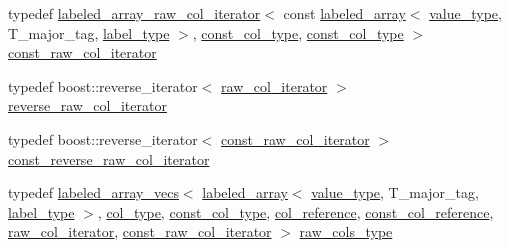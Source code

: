 \begin{DoxyCompactItemize}
\item 
typedef \hyperlink{classIceBRG_1_1labeled__array__raw__col__iterator}{labeled\+\_\+array\+\_\+raw\+\_\+col\+\_\+iterator}$<$ const \hyperlink{classIceBRG_1_1labeled__array}{labeled\+\_\+array}$<$ \hyperlink{classIceBRG_1_1labeled__array_a183002e8991647a6fbed8c13b64ff8f4}{value\+\_\+type}, T\+\_\+major\+\_\+tag, \hyperlink{classIceBRG_1_1labeled__array_a6355a8e274be241162cfe4717bcd907f}{label\+\_\+type} $>$, \hyperlink{classIceBRG_1_1labeled__array_aeba72c01006c312aedb340192a56901a}{const\+\_\+col\+\_\+type}, \hyperlink{classIceBRG_1_1labeled__array_aeba72c01006c312aedb340192a56901a}{const\+\_\+col\+\_\+type} $>$ \hyperlink{classIceBRG_1_1labeled__array_acfa6b748c386d02309a161e84f02e59d}{const\+\_\+raw\+\_\+col\+\_\+iterator}
\item 
typedef boost\+::reverse\+\_\+iterator$<$ \hyperlink{classIceBRG_1_1labeled__array_a61c797b83845ec6cc53d2ecb73899ad1}{raw\+\_\+col\+\_\+iterator} $>$ \hyperlink{classIceBRG_1_1labeled__array_a5c4132b2acc103385909ec165cd1a040}{reverse\+\_\+raw\+\_\+col\+\_\+iterator}
\item 
typedef boost\+::reverse\+\_\+iterator$<$ \hyperlink{classIceBRG_1_1labeled__array_acfa6b748c386d02309a161e84f02e59d}{const\+\_\+raw\+\_\+col\+\_\+iterator} $>$ \hyperlink{classIceBRG_1_1labeled__array_a397a1dbf20485f08dcf6b6a7b746d403}{const\+\_\+reverse\+\_\+raw\+\_\+col\+\_\+iterator}
\item 
typedef \hyperlink{classIceBRG_1_1labeled__array__vecs}{labeled\+\_\+array\+\_\+vecs}$<$ \hyperlink{classIceBRG_1_1labeled__array}{labeled\+\_\+array}$<$ \hyperlink{classIceBRG_1_1labeled__array_a183002e8991647a6fbed8c13b64ff8f4}{value\+\_\+type}, T\+\_\+major\+\_\+tag, \hyperlink{classIceBRG_1_1labeled__array_a6355a8e274be241162cfe4717bcd907f}{label\+\_\+type} $>$, \hyperlink{classIceBRG_1_1labeled__array_a4ee8f2983b8f309f1a8a470c12f56f2f}{col\+\_\+type}, \hyperlink{classIceBRG_1_1labeled__array_aeba72c01006c312aedb340192a56901a}{const\+\_\+col\+\_\+type}, \hyperlink{classIceBRG_1_1labeled__array_aa7217b6c3b4a663d16f579aebab5e5cf}{col\+\_\+reference}, \hyperlink{classIceBRG_1_1labeled__array_ac655d340cc0011b66a5b8433c76841e3}{const\+\_\+col\+\_\+reference}, \hyperlink{classIceBRG_1_1labeled__array_a61c797b83845ec6cc53d2ecb73899ad1}{raw\+\_\+col\+\_\+iterator}, \hyperlink{classIceBRG_1_1labeled__array_acfa6b748c386d02309a161e84f02e59d}{const\+\_\+raw\+\_\+col\+\_\+iterator} $>$ \hyperlink{classIceBRG_1_1labeled__array_a5135379d418bba0a185e5c26a9774f78}{raw\+\_\+cols\+\_\+type}
\item 

\end{DoxyCompactItemize}
